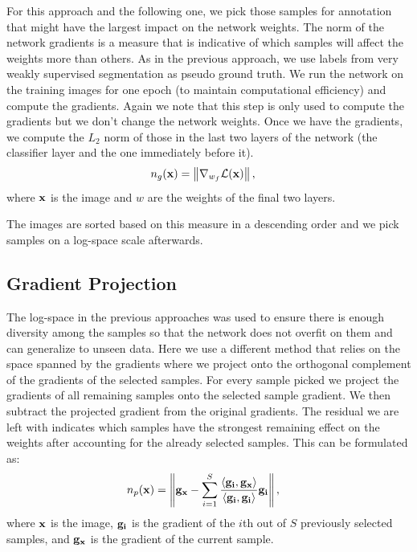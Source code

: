 For this approach and the following one, we pick those samples for annotation that might have the largest impact on the network weights. The norm of the network gradients is a measure that is indicative of which samples will affect the weights more than others. As in the previous approach, we use labels from very weakly supervised segmentation as pseudo ground truth. We run the network on the training images for one epoch (to maintain computational efficiency) and compute the gradients. Again we note that this step is only used to compute the gradients but we don't change the network weights. Once we have the gradients, we compute the $L_2$ norm of those in the last two layers of the network (the classifier layer and the one immediately before it).
\begin{align}
n_g(\bold{x}) &=  \left\lVert \nabla_{w_f} \mathcal{L}(\bold{x}) \right\rVert,
\end{align}  
where $\bold{x}$ is the image and $w$ are the weights of the final two layers.

The images are sorted based on this measure in a descending order and we pick samples on a log-space scale afterwards.

\subsection{Gradient Projection} \label{sec:grad_proj}

The log-space in the previous approaches was used to ensure there is enough diversity among the samples so that the network does not overfit on them and can generalize to unseen data. Here we use a different method that relies on the space spanned by the gradients where we project onto the orthogonal complement of the gradients of the selected samples. For every sample picked we project the gradients of all remaining samples onto the selected sample gradient. We then subtract the projected gradient from the original gradients. The residual we are left with indicates which samples have the strongest remaining effect on the weights after accounting for the already selected samples. This can be formulated as:
\begin{align}
n_p(\bold{x}) &=  \left\lVert \bold{g_x} - \sum_{i=1}^S \frac{\left\langle \bold{g_i}, \bold{g_x} \right\rangle}{\left\langle \bold{g_i}, \bold{g_i} \right\rangle} \bold{g_i} \right\rVert,
\end{align}
where $\bold{x}$ is the image, $\bold{g_i}$ is the gradient of the $i$th out of $S$ previously selected samples, and $\bold{g_x}$ is the gradient of the current sample.

